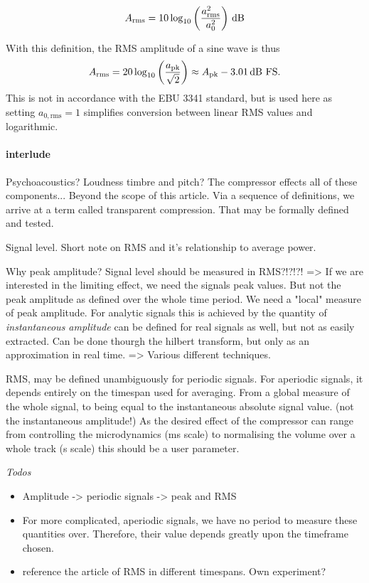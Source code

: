 \documentclass[../main2.tex]{subfiles}
\begin{document}
\begin{equation}
A_\text{rms} =
10 \log_{10} \left( \frac{a_\text{rms}^2}{a_0^2} \right) \mskip3mu\text{dB}
\end{equation}



With this definition, the RMS amplitude of a sine wave is thus
\begin{equation}
A_\text{rms} = 20\log_{10} \left( \frac{a_\text{pk}}{\sqrt 2} \right) \approx A_\text{pk} - 3.01 \mskip3mu\text{dB FS}.
\end{equation}
This is not in accordance with the EBU 3341 standard, but is used here as setting $a_{0, \text{rms}} = 1$ simplifies conversion between linear RMS values and logarithmic.


\paragraph{interlude}

Psychoacoustics? Loudness timbre and pitch? The compressor effects all of these components... Beyond the scope of this article. Via a sequence of definitions, we arrive at a term called transparent compression. That may be formally defined and tested.

Signal level. Short note on RMS and it's relationship to average power.

Why peak amplitude? Signal level should be measured in RMS?!?!?!
=> If we are interested in the limiting effect, we need the signals peak values.
But not the peak amplitude as defined over the whole time period. We need a "local" measure of peak amplitude. For analytic signals this is achieved by the quantity of \emph{instantaneous amplitude} can be defined for real signals as well, but not as easily extracted. Can be done thourgh the hilbert transform, but only as an approximation in real time. => Various different techniques. 

RMS, may be defined unambiguously for periodic signals. For aperiodic signals, it depends entirely on the timespan used for averaging. From a global measure of the whole signal, to being equal to the instantaneous absolute signal value. (not the instantaneous amplitude!) As the desired effect of the compressor can range from controlling the microdynamics (ms scale) to normalising the volume over a whole track (s scale) this should be a user parameter. 

\emph{Todos}
\begin{itemize}
\item Amplitude -> periodic signals -> peak and RMS
\item For more complicated, aperiodic signals, we have no period to measure these quantities over. Therefore, their value depends greatly upon the timeframe chosen.
\item reference the article of RMS in different timespans. Own experiment?
\end{itemize}
\end{document}
